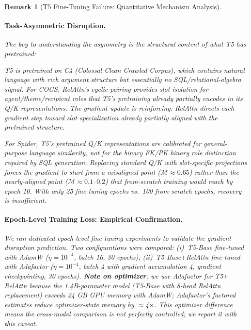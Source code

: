 \documentclass[conference]{IEEEtran}
\newtheorem{remark}{Remark}
\begin{document}
\begin{remark}[T5 Fine-Tuning Failure: Quantitative Mechanism Analysis]
\paragraph{Task-Asymmetric Disruption.}
The key to understanding the asymmetry is the \emph{structural content} of what T5 has pretrained:

\begin{center}
	\small
\end{center}

T5 is pretrained on C4 (Colossal Clean Crawled Corpus), which contains natural language with rich argument structure but essentially no SQL/relational-algebra signal. For COGS, RelAttn's cyclic pairing provides slot isolation for agent/theme/recipient roles that T5's pretraining already partially encodes in its Q/K representations. The gradient update is \emph{reinforcing}: RelAttn directs each gradient step toward slot specialization already partially aligned with the pretrained structure.

For Spider, T5's pretrained Q/K representations are calibrated for general-purpose language similarity, not for the binary FK/PK binary role distinction required by SQL generation. Replacing standard Q/K with slot-specific projections forces the gradient to start from a misaligned point ($\mathcal{M} \approx 0.65$) rather than the nearly-aligned point ($\mathcal{M} \approx 0.1$--$0.2$) that from-scratch training would reach by epoch 10. With only 25 fine-tuning epochs vs.\ 100 from-scratch epochs, recovery is insufficient.

\paragraph{Epoch-Level Training Loss: Empirical Confirmation.}
We ran dedicated epoch-level fine-tuning experiments to validate the gradient disruption prediction. Two configurations were compared: (i)~T5-Base fine-tuned with AdamW ($\eta{=}10^{-4}$, batch 16, 30 epochs); (ii)~T5-Base$+$RelAttn fine-tuned with Adafactor ($\eta{=}10^{-4}$, batch 4 with gradient accumulation 4, gradient checkpointing, 30 epochs). \textbf{Note on optimizer}: we use Adafactor for T5$+$RelAttn because the 1.4B-parameter model (T5-Base with 8-head RelAttn replacement) exceeds 24 GB GPU memory with AdamW; Adafactor's factored estimates reduce optimizer-state memory by $\approx$4$\times$. This optimizer difference means the cross-model comparison is not perfectly controlled; we report it with this caveat.


\end{remark}
\end{document}
